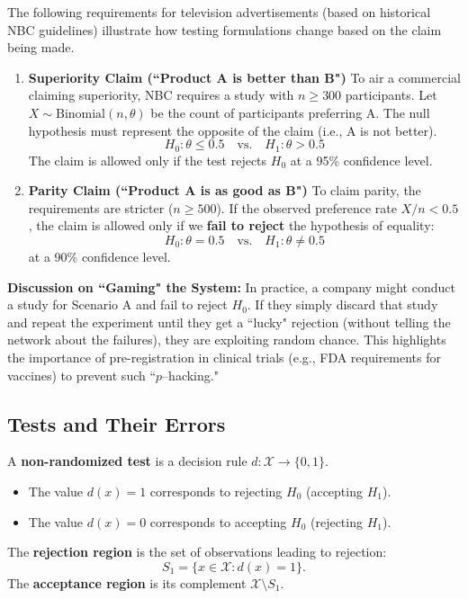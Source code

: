\begin{ex}\label{ex:television_ads}
The following requirements for television advertisements (based on historical NBC guidelines) illustrate how testing formulations change based on the claim being made.
\begin{enumerate}[label=\alph*)]
\item 

\textbf{Superiority Claim (``Product A is better than B")}
To air a commercial claiming superiority, NBC requires a study with $n \ge 300$ participants. Let $X \sim \text{Binomial}(n,\theta)$ be the count of participants preferring A.
The null hypothesis must represent the opposite of the claim (i.e., A is not better).
\[
H_0: \theta \le 0.5 \quad \text{vs.} \quad H_1: \theta > 0.5
\]
The claim is allowed only if the test rejects $H_0$ at a 95\% confidence level.

\item 
\textbf{Parity Claim (``Product A is as good as B")}
To claim parity, the requirements are stricter ($n \ge 500$). If the observed preference rate $X/n < 0.5$, the claim is allowed only if we \textbf{fail to reject} the hypothesis of equality:
\[
H_0: \theta = 0.5 \quad \text{vs.} \quad H_1: \theta \neq 0.5
\]
at a 90\% confidence level.
\end{enumerate}

\textbf{Discussion on ``Gaming" the System:}
In practice, a company might conduct a study for Scenario A and fail to reject $H_0$. If they simply discard that study and repeat the experiment until they get a ``lucky" rejection (without telling the network about the failures), they are exploiting random chance. This highlights the importance of pre-registration in clinical trials (e.g., FDA requirements for vaccines) to prevent such ``\(p\)--hacking."

\end{ex}

\subsection{Tests and Their Errors}

\begin{definition}
A \textbf{non-randomized test} is a decision rule \(d: \mathcal{X} \to \{0,1\}\).
\begin{itemize}
    \item The value \(d(x) = 1\) corresponds to rejecting \(H_0\) (accepting \(H_1\)).
    \item The value \(d(x) = 0\) corresponds to accepting \(H_0\) (rejecting \(H_1\)).
\end{itemize}
The \textbf{rejection region} is the set of observations leading to rejection:
\[ S_1 = \{x \in \mathcal{X} : d(x) = 1\}. \]
The \textbf{acceptance region} is its complement \(\mathcal{X} \setminus S_1\).
\end{definition}



